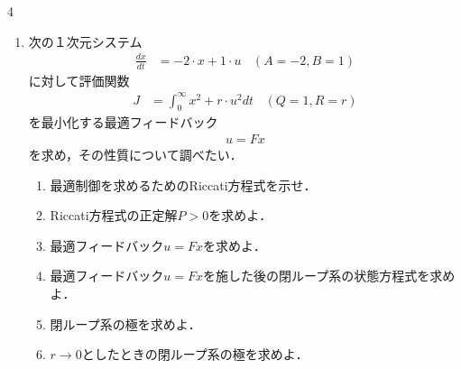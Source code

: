 \begin{multicols}{4}
\begin{enumerate}
\item
次の１次元システム
\begin{align}
	\frac{dx}{dt} &= -2 \cdot x + 1 \cdot u
	\ \ \ \  (A=-2, B=1) 
\nonumber
\end{align}
に対して評価関数
\begin{align}
	J &= \int_0^\infty x^2 + r \cdot u^2 dt
	\ \ \ \  (Q=1, R=r)
\nonumber
\end{align}
を最小化する最適フィードバック
\begin{align}
	u=Fx
\nonumber
\end{align}
を求め，その性質について調べたい．

\vfill\null
\columnbreak


\begin{enumerate}
\item 
最適制御を求めるためのRiccati方程式を示せ．
\vspace{3cm}

\item
Riccati方程式の正定解$P>0$を求めよ．
\vspace{8cm}

\item
最適フィードバック$u=Fx$を求めよ．
\vspace{4cm}

\item
最適フィードバック$u=Fx$を施した後の閉ループ系の状態方程式を求めよ．
\vspace{4cm}
\item
閉ループ系の極を求めよ．
\vspace{2cm}


\vfill\null
\columnbreak

\item
$r\rightarrow 0$としたときの閉ループ系の極を求めよ．
\vspace{2cm}


\end{enumerate}
\end{enumerate}
\end{multicols}
